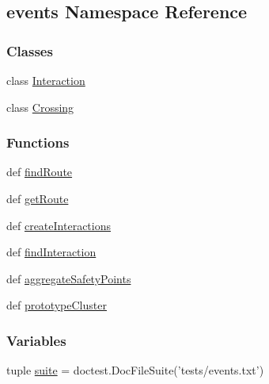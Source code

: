 \hypertarget{namespaceevents}{\subsection{events Namespace Reference}
\label{namespaceevents}
}
\subsubsection*{Classes}
\begin{DoxyCompactItemize}
\item 
class \hyperlink{classevents_1_1Interaction}{Interaction}
\item 
class \hyperlink{classevents_1_1Crossing}{Crossing}
\end{DoxyCompactItemize}
\subsubsection*{Functions}
\begin{DoxyCompactItemize}
\item 
def \hyperlink{namespaceevents_ad1bbbcb77c6a6dca6b714fab9715ea60}{find\-Route}
\item 
def \hyperlink{namespaceevents_a011667c9f2f27471b324b5b619422eff}{get\-Route}
\item 
def \hyperlink{namespaceevents_a6bb1ae1f6c4390259f31283b42e47226}{create\-Interactions}
\item 
def \hyperlink{namespaceevents_a8ccc205d28f566bc37f2aa14ff8f1752}{find\-Interaction}
\item 
def \hyperlink{namespaceevents_a79b0738b69501495483c3271da8b78df}{aggregate\-Safety\-Points}
\item 
def \hyperlink{namespaceevents_a5c9f44acb866e8042e37254e66919d1b}{prototype\-Cluster}
\end{DoxyCompactItemize}
\subsubsection*{Variables}
\begin{DoxyCompactItemize}
\item 
tuple \hyperlink{namespaceevents_a3c915c18c4e352f1c535943d3e4cf851}{suite} = doctest.\-Doc\-File\-Suite('tests/events.\-txt')
\end{DoxyCompactItemize}


